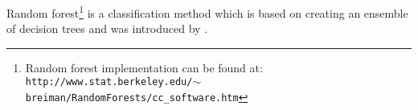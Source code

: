 \begin{enumerate}[leftmargin=*]
Random forest\footnote{Random forest implementation can be found at: \texttt{http://www.stat.\allowbreak berkeley.edu/$\sim$breiman/RandomForests/cc\_software.htm}} is a classification method which is based on creating an ensemble of decision trees and was introduced by \cite{Breiman2001}. %
%
%

\end{enumerate}
